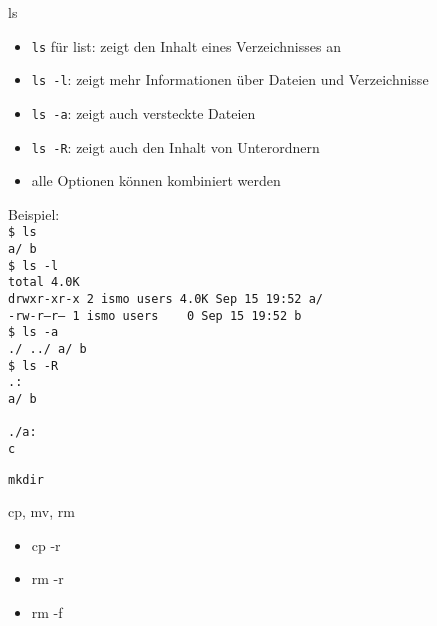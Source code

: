     \begin{frame}{ls}
      \begin{itemize}
        \item \texttt{ls} für list: zeigt den Inhalt eines Verzeichnisses an
        \item \texttt{ls -l}: zeigt mehr Informationen über Dateien und Verzeichnisse
        \item \texttt{ls -a}: zeigt auch versteckte Dateien
        \item \texttt{ls -R}: zeigt auch den Inhalt von Unterordnern
        \item alle Optionen können kombiniert werden
      \end{itemize}
    \end{frame}

    \begin{frame}
      Beispiel:\\
      \texttt{\$ ls\\
              a/  b\\
              \$ ls -l\\
              total 4.0K\\
              drwxr-xr-x 2 ismo users 4.0K Sep 15 19:52 a/\\
              -rw-r--r-- 1 ismo users \ \ \ 0 Sep 15 19:52 b\\
              \$ ls -a\\
              ./  ../  a/  b\\
              \$ ls -R\\
              .:\\
              a/  b\\
              ~\\
              ./a:\\
              c}
    \end{frame}

    \begin{frame}{\texttt{mkdir}}
    \end{frame}

    \begin{frame}{cp, mv, rm}
      \begin{itemize}
        \item cp -r\\
        \item rm -r\\
        \item rm -f
      \end{itemize}
    \end{frame}

